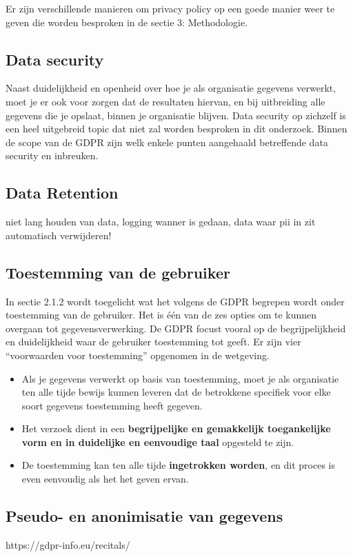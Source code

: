 Er zijn verschillende manieren om privacy policy op een goede manier weer te geven die worden besproken in de sectie 3: Methodologie. 

\subsection{Data security}
Naast duidelijkheid en openheid over hoe je als organisatie gegevens verwerkt, moet je er ook voor zorgen dat de resultaten hiervan, en bij uitbreiding alle gegevens die je opslaat, binnen je organisatie blijven. Data security op zichzelf is een heel uitgebreid topic dat niet zal worden besproken in dit onderzoek. Binnen de scope van de GDPR zijn welk enkele punten aangehaald betreffende data security en inbreuken. 

\subsection{Data Retention}
niet lang houden van data, logging wanner is gedaan, data waar pii in zit automatisch verwijderen! 

\subsection{Toestemming van de gebruiker}
In sectie 2.1.2 wordt toegelicht wat het volgens de GDPR begrepen wordt onder toestemming van de gebruiker. Het is één van de zes opties om te kunnen overgaan tot gegevensverwerking. De GDPR focust vooral op de begrijpelijkheid en duidelijkheid waar de gebruiker toestemming tot geeft. Er zijn vier “voorwaarden voor toestemming” opgenomen in de wetgeving. 
\begin{itemize}
    \item  Als je gegevens verwerkt op basis van toestemming, moet je als organisatie ten alle tijde bewijs kunnen leveren dat de betrokkene specifiek voor elke soort gegevens toestemming heeft gegeven. 
    \item  Het verzoek dient in een \textbf{begrijpelijke en gemakkelijk toegankelijke vorm en in duidelijke en eenvoudige taal} opgesteld te zijn. 
    \item  
    De toestemming kan ten alle tijde \textbf{ingetrokken worden}, en dit proces is even eenvoudig als het het geven ervan. 
\end{itemize}


 

\subsection{Pseudo- en anonimisatie van gegevens}
https://gdpr-info.eu/recitals/


